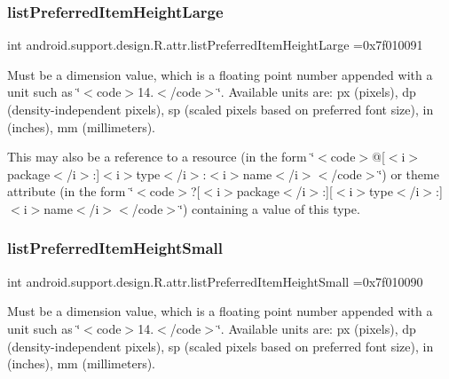 \subsubsection{\texorpdfstring{list\+Preferred\+Item\+Height\+Large}{listPreferredItemHeightLarge}}
{\footnotesize\ttfamily int android.\+support.\+design.\+R.\+attr.\+list\+Preferred\+Item\+Height\+Large =0x7f010091\hspace{0.3cm}{\ttfamily [static]}}

Must be a dimension value, which is a floating point number appended with a unit such as \char`\"{}$<$code$>$14.\+5sp$<$/code$>$\char`\"{}. Available units are\+: px (pixels), dp (density-\/independent pixels), sp (scaled pixels based on preferred font size), in (inches), mm (millimeters). 

This may also be a reference to a resource (in the form \char`\"{}$<$code$>$@\mbox{[}$<$i$>$package$<$/i$>$\+:\mbox{]}$<$i$>$type$<$/i$>$\+:$<$i$>$name$<$/i$>$$<$/code$>$\char`\"{}) or theme attribute (in the form \char`\"{}$<$code$>$?\mbox{[}$<$i$>$package$<$/i$>$\+:\mbox{]}\mbox{[}$<$i$>$type$<$/i$>$\+:\mbox{]}$<$i$>$name$<$/i$>$$<$/code$>$\char`\"{}) containing a value of this type. \mbox{\label{classandroid_1_1support_1_1design_1_1R_1_1attr_a8e453f1de1f5bad7dd2c255116542ce2}} 
\subsubsection{\texorpdfstring{list\+Preferred\+Item\+Height\+Small}{listPreferredItemHeightSmall}}
{\footnotesize\ttfamily int android.\+support.\+design.\+R.\+attr.\+list\+Preferred\+Item\+Height\+Small =0x7f010090\hspace{0.3cm}{\ttfamily [static]}}

Must be a dimension value, which is a floating point number appended with a unit such as \char`\"{}$<$code$>$14.\+5sp$<$/code$>$\char`\"{}. Available units are\+: px (pixels), dp (density-\/independent pixels), sp (scaled pixels based on preferred font size), in (inches), mm (millimeters). 

